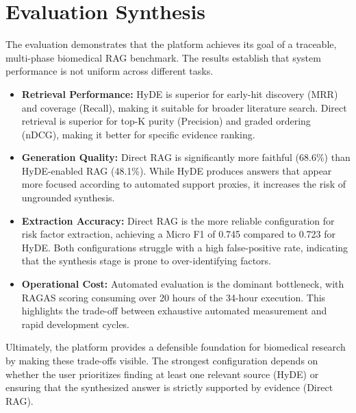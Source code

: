 \section{Evaluation Synthesis}

The evaluation demonstrates that the platform achieves its goal of a traceable, multi-phase biomedical RAG benchmark. The results establish that system performance is not uniform across different tasks.

\begin{itemize}
    \item \textbf{Retrieval Performance:} HyDE is superior for early-hit discovery (MRR) and coverage (Recall), making it suitable for broader literature search. Direct retrieval is superior for top-K purity (Precision) and graded ordering (nDCG), making it better for specific evidence ranking.
    \item \textbf{Generation Quality:} Direct RAG is significantly more faithful (68.6\%) than HyDE-enabled RAG (48.1\%). While HyDE produces answers that appear more focused according to automated support proxies, it increases the risk of ungrounded synthesis.
    \item \textbf{Extraction Accuracy:} Direct RAG is the more reliable configuration for risk factor extraction, achieving a Micro F1 of 0.745 compared to 0.723 for HyDE. Both configurations struggle with a high false-positive rate, indicating that the synthesis stage is prone to over-identifying factors.
    \item \textbf{Operational Cost:} Automated evaluation is the dominant bottleneck, with RAGAS scoring consuming over 20 hours of the 34-hour execution. This highlights the trade-off between exhaustive automated measurement and rapid development cycles.
\end{itemize}

Ultimately, the platform provides a defensible foundation for biomedical research by making these trade-offs visible. The strongest configuration depends on whether the user prioritizes finding at least one relevant source (HyDE) or ensuring that the synthesized answer is strictly supported by evidence (Direct RAG).
